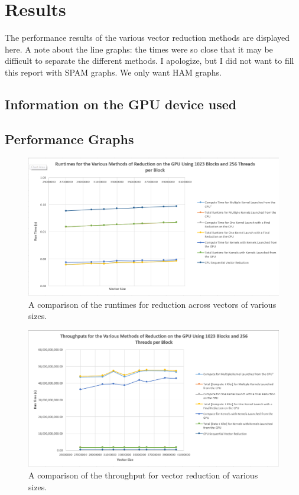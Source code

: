 \documentclass{article}
\begin{document}
\newpage
\section{Results}
The performance results of the various vector reduction methods are displayed here. A note about the line graphs: the times were so close that it may be difficult to separate the different methods. I apologize, but I did not want to fill this report with SPAM graphs. We only want HAM graphs.

\subsection{Information on the GPU device used}

\newpage
\subsection{Performance Graphs}
  \begin{figure}[h!]
    \centering
    \includegraphics[width=.9\linewidth]{runtime_line}
    \caption{A comparison of the runtimes for reduction across vectors of various sizes.}
    \label{fig:runtime_line}
  \end{figure}

  \begin{figure}[h!]
    \centering
    \includegraphics[width=.9\linewidth]{throughput_line}
    \caption{A comparison of the throughput for vector reduction of various sizes.}
    \label{fig:throughput_line}
  \end{figure}
\end{document}
